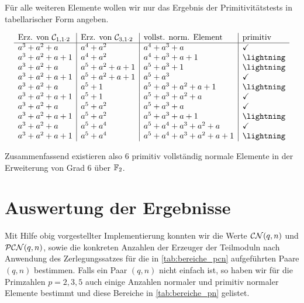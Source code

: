 Für alle weiteren Elemente wollen wir nur das Ergebnis der Primitivitätstests
in tabellarischer Form angeben.

\[\begin{array}{l|l|l|l}
  \text{Erz. von } \C_{1,1\cdot 2} & \text{Erz. von } \C_{3,1\cdot 2} &
    \text{vollst. norm. Element} & 
    \text{primitiv} \\\hline
  a^3+a^2+a & a^4+a^2 & a^4+a^3 +a & \checkmark\\
  a^3+a^2+a+1 & a^4+a^2 & a^4+a^3+a+1 & \lightning\\
  a^3+a^2+a & a^5+a^2+a+1 & a^5+a^3+1 & \lightning\\
  a^3+a^2+a+1 &a^5+a^2+a+1 & a^5+a^3 & \checkmark\\
  a^3+a^2+a & a^5+1 & a^5 +a^3+a^2+a+1& \lightning\\
  a^3+a^2+a+1 &a^5+1 & a^5+a^3+a^2+a &\checkmark\\
  a^3+a^2+a & a^5+a^2 & a^5+a^3+a & \checkmark\\
  a^3+a^2+a+1 & a^5+a^2& a^5+a^3+a+1 &\lightning\\
  a^3+a^2+a & a^5+a^4 & a^5+a^4+a^3+a^2+a &\checkmark\\
  a^3+a^2+a+1 & a^5+a^4 & a^5+a^4+a^3+a^2+a+1 &\lightning\\
  \end{array}\]

Zusammenfassend existieren also $6$ primitiv vollständig normale Elemente in
der Erweiterung von Grad $6$ über $\mathbb{F}_2$.

\section{Auswertung der Ergebnisse}

Mit Hilfe obig vorgestellter Implementierung konnten wir die Werte
$\mathcal{CN}(q,n)$ und $\mathcal{PCN}(q,n)$, sowie die konkreten Anzahlen der Erzeuger der
Teilmoduln nach Anwendung des Zerlegungssatzes für die in 
\autoref{tab:bereiche_pcn} aufgeführten Paare $(q,n)$ bestimmen.
Falls ein Paar $(q,n)$ nicht einfach ist, so haben wir für die Primzahlen
$p=2,3,5$ auch einige Anzahlen normaler und primitiv normaler Elemente bestimmt
und diese Bereiche in \autoref{tab:bereiche_pn} gelistet.

